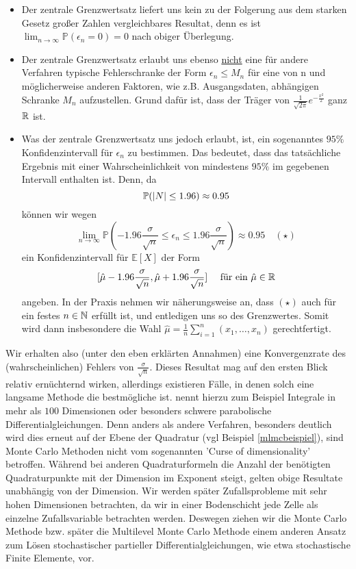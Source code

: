 	 \begin{itemize}
	 	\item Der zentrale Grenzwertsatz liefert uns kein zu der Folgerung aus dem starken Gesetz großer Zahlen vergleichbares Resultat, denn es ist  $ \lim_{n \to \infty} \mathbb{P}(\epsilon_n = 0) = 0 $ nach obiger Überlegung.
	 	\item Der zentrale Grenzwertsatz erlaubt uns ebenso \underline{nicht} eine für andere Verfahren typische Fehlerschranke der Form $ \epsilon_n \leq M_n $ für eine von n und möglicherweise anderen Faktoren, wie z.B. Ausgangsdaten, abhängigen Schranke $ M_n $ aufzustellen. Grund dafür ist, dass der Träger von $\frac{1}{\sqrt{2\pi}}e^{-\frac{x^2}{2}}$ ganz $ \mathbb{R} $ ist.
	 	\item Was der zentrale Grenzwertsatz uns jedoch erlaubt, ist, ein sogenanntes $ 95\% $ Konfidenzintervall für $ \epsilon_n $ zu bestimmen. Das bedeutet, dass das tatsächliche Ergebnis mit einer Wahrscheinlichkeit von mindestens $ 95 \% $ im gegebenen Intervall enthalten ist. Denn, da 
	 	\[
	 		\mathbb{P}(| N | \leq 1.96) \approx 0.95
	 	\]
	 	können wir wegen
	 	\[
	 		\lim\limits_{n\to\infty}\mathbb{P}(-1.96\frac{\sigma}{\sqrt{n}}\leq \epsilon_n \leq 1.96\frac{\sigma}{\sqrt{n}}) \approx 0.95 \quad (\star)
	 	\]
	 	ein Konfidenzintervall für $ \mathbb{E}[X] $ der Form
	 	\[
	 		[\hat{\mu}-1.96\frac{\sigma}{\sqrt{n}},\hat{\mu}+1.96\frac{\sigma}{\sqrt{n}}] \quad \text{ für ein } \hat{\mu} \in \mathbb{R}  
	 	\]
	 	angeben. In der Praxis nehmen wir näherungsweise an, dass $ (\star) $ auch für ein festes $ n \in \mathbb{N} $ erfüllt ist, und entledigen uns so des Grenzwertes. Somit wird dann insbesondere die Wahl $ \hat{\mu} = \frac{1}{n}\sum_{i=1}^{n}(x_1,\dots,x_n) $ gerechtfertigt.
	 \end{itemize}
 	Wir erhalten also (unter den eben erklärten Annahmen) eine Konvergenzrate des (wahrscheinlichen) Fehlers von $ \frac{\sigma}{\sqrt{n}} $. Dieses Resultat mag auf den ersten Blick relativ ernüchternd wirken, allerdings existieren Fälle, in denen solch eine langsame Methode die bestmögliche ist. \cite{lapeyre2003introduction} nennt hierzu zum Beispiel Integrale in mehr als $ 100 $ Dimensionen oder besonders schwere parabolische Differentialgleichungen. Denn anders als andere Verfahren, besonders deutlich wird dies erneut auf der Ebene der Quadratur (vgl Beispiel \ref{mlmcbeispiel}), sind Monte Carlo Methoden nicht vom sogenannten 'Curse of dimensionality' betroffen. Während bei anderen Quadraturformeln die Anzahl der benötigten Quadraturpunkte mit der Dimension im Exponent steigt, gelten obige Resultate unabhängig von der Dimension. Wir werden später Zufallsprobleme mit sehr hohen Dimensionen betrachten, da wir in einer Bodenschicht jede Zelle als einzelne Zufallsvariable betrachten werden. Deswegen ziehen wir die Monte Carlo Methode bzw. später die Multilevel Monte Carlo Methode einem anderen Ansatz zum Lösen stochastischer partieller Differentialgleichungen, wie etwa stochastische Finite Elemente, vor.

